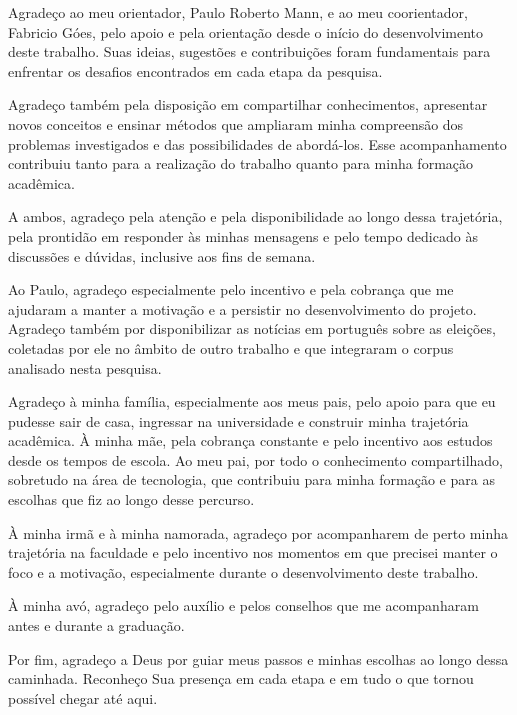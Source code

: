 \begin{agradecimentos}
Agradeço ao meu orientador, Paulo Roberto Mann, e ao meu coorientador, Fabricio Góes, pelo apoio e pela orientação desde o início do desenvolvimento deste trabalho. Suas ideias, sugestões e contribuições foram fundamentais para enfrentar os desafios encontrados em cada etapa da pesquisa.

Agradeço também pela disposição em compartilhar conhecimentos, apresentar novos conceitos e ensinar métodos que ampliaram minha compreensão dos problemas investigados e das possibilidades de abordá-los. Esse acompanhamento contribuiu tanto para a realização do trabalho quanto para minha formação acadêmica.

A ambos, agradeço pela atenção e pela disponibilidade ao longo dessa trajetória, pela prontidão em responder às minhas mensagens e pelo tempo dedicado às discussões e dúvidas, inclusive aos fins de semana.

Ao Paulo, agradeço especialmente pelo incentivo e pela cobrança que me ajudaram a manter a motivação e a persistir no desenvolvimento do projeto. Agradeço também por disponibilizar as notícias em português sobre as eleições, coletadas por ele no âmbito de outro trabalho e que integraram o corpus analisado nesta pesquisa.

Agradeço à minha família, especialmente aos meus pais, pelo apoio para que eu pudesse sair de casa, ingressar na universidade e construir minha trajetória acadêmica. À minha mãe, pela cobrança constante e pelo incentivo aos estudos desde os tempos de escola. Ao meu pai, por todo o conhecimento compartilhado, sobretudo na área de tecnologia, que contribuiu para minha formação e para as escolhas que fiz ao longo desse percurso.

À minha irmã e à minha namorada, agradeço por acompanharem de perto minha trajetória na faculdade e pelo incentivo nos momentos em que precisei manter o foco e a motivação, especialmente durante o desenvolvimento deste trabalho.

À minha avó, agradeço pelo auxílio e pelos conselhos que me acompanharam antes e durante a graduação.

Por fim, agradeço a Deus por guiar meus passos e minhas escolhas ao longo dessa caminhada. Reconheço Sua presença em cada etapa e em tudo o que tornou possível chegar até aqui.
\end{agradecimentos}
